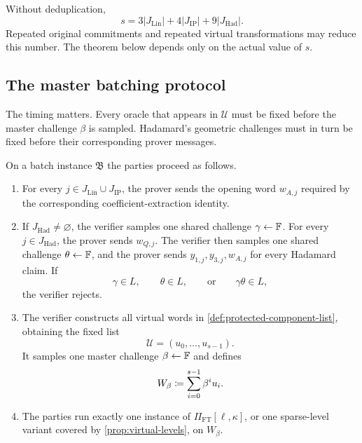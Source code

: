 Without deduplication,
\begin{equation}
  s
  =3|J_{\mathrm{Lin}}|
   +4|J_{\mathrm{IP}}|
   +9|J_{\mathrm{Had}}|.
  \label{eq:naive-protected-count}
\end{equation}
Repeated original commitments and repeated virtual transformations may reduce this number.  The theorem below depends only on the actual value of $s$.

\subsection{The master batching protocol}
\label{sec:master-batching-protocol}

The timing matters.  Every oracle that appears in $\mathcal U$ must be fixed before the master challenge $\beta$ is sampled.  Hadamard's geometric challenges must in turn be fixed before their corresponding prover messages.

\begin{definition}
\label{def:heterogeneous-batching-protocol}
On a batch instance $\mathfrak B$ the parties proceed as follows.
\begin{enumerate}[label=\textnormal{\arabic*.},leftmargin=*]
  \item For every $j\in J_{\mathrm{Lin}}\cup J_{\mathrm{IP}}$, the prover sends the opening word $w_{A,j}$ required by the corresponding coefficient-extraction identity.

  \item If $J_{\mathrm{Had}}\ne\varnothing$, the verifier samples one shared challenge $\gamma\leftarrow\mathbb{F}$.  For every $j\in J_{\mathrm{Had}}$, the prover sends $w_{Q,j}$.  The verifier then samples one shared challenge $\theta\leftarrow\mathbb{F}$, and the prover sends $y_{1,j},y_{3,j},w_{A,j}$ for every Hadamard claim.  If
  \[
    \gamma\in L,
    \qquad
    \theta\in L,
    \qquad\text{or}\qquad
    \gamma\theta\in L,
  \]
  the verifier rejects.

  \item The verifier constructs all virtual words in \cref{def:protected-component-list}, obtaining the fixed list
  \[
    \mathcal U=(u_0,\ldots,u_{s-1}).
  \]
  It samples one master challenge $\beta\leftarrow\mathbb{F}$ and defines
  \begin{equation}
    W_\beta
    \coloneqq
    \sum_{i=0}^{s-1}\beta^iu_i.
    \label{eq:master-batch-word}
  \end{equation}

  \item The parties run exactly one instance of $\Pi_{\mathrm{FT}}[\ell,\kappa]$, or one sparse-level variant covered by \cref{prop:virtual-levels}, on $W_\beta$.
\end{enumerate}
\end{definition}

